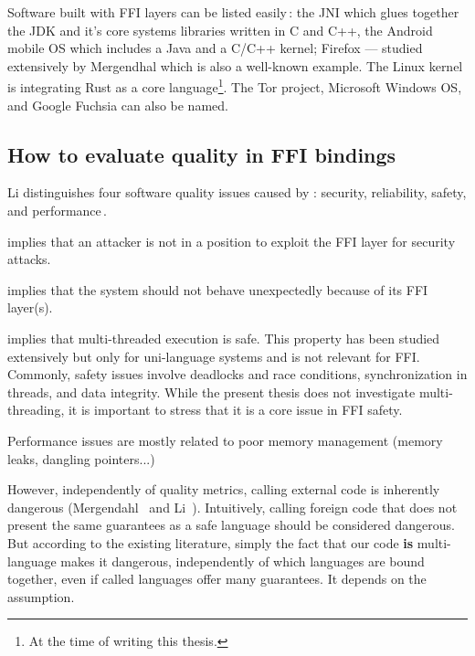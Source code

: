 \documentclass[nomenclature, english, bibtex]{kththesis}
\begin{document}
Software built with FFI layers can be listed easily\,\cite{li_improving_2014,li_detecting_2022,mergendahl_cross-language_2022}: the \gls{JNI} which glues together the \gls{JDK} and it's core systems libraries written in C and C++, the Android mobile \gls{OS} which includes a Java  and a C/C++ kernel; Firefox --- studied extensively by Mergendhal \etal which is also a well-known example. The Linux kernel is integrating Rust as a core language\footnote{At the time of writing this thesis.}. The Tor project, Microsoft Windows \gls{OS}, and Google Fuchsia can also be named.

\subsection{How to evaluate quality in FFI bindings}

Li distinguishes four software quality issues caused by : security, reliability, safety, and performance\,\cite{li_improving_2014}.

\begin{description}[labelwidth=\widthof{\textbf{Memory safety}}, leftmargin = !]
\item[\textbf{Security}] implies that an attacker is not in a position to exploit the FFI layer for security attacks. 
\item[\textbf{Reliability}]implies that the system should not behave unexpectedly because of its FFI layer(s).
\item[\textbf{Safety}] implies that multi-threaded execution is safe. This property has been studied extensively but only for uni-language systems and is not relevant for FFI. Commonly, safety issues involve deadlocks and race conditions, synchronization in threads, and data integrity. While the present thesis does not investigate multi-threading, it is important to stress that it is a core issue in FFI safety.
\item[\textbf{Performance}] Performance issues are mostly related to poor memory management (memory leaks, dangling pointers...)
\end{description}

However, independently of quality metrics, calling external code is inherently dangerous (Mergendahl \etal\,\cite{mergendahl_cross-language_2022} and Li \etal\,\cite{li_detecting_2022}). Intuitively, calling foreign code that does not present the same guarantees as a safe language should be considered dangerous. But according to the existing literature, simply the fact that our code \textbf{is} multi-language makes it dangerous, independently of which languages are bound together, even if called languages offer many guarantees. It depends on the assumption.
\end{document}
